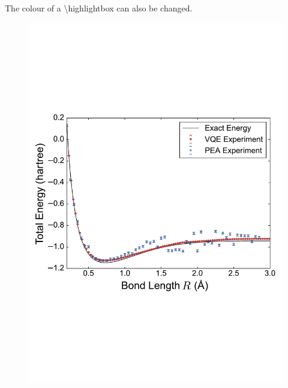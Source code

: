 \documentclass[14pt,landscape,color=UCLdarkred,margin=3cm]{uclposter}
\begin{document}
\begin{multicols}{3}
\begin{highlightbox}
	The colour of a \textbackslash highlightbox can also be changed.
\end{highlightbox}

\begin{figure}[H]
  \begin{center}
  \includegraphics[scale=1.5]{result.pdf}
  \end{center}
    
 

   
\end{figure}




\end{multicols}
	
\end{document}

